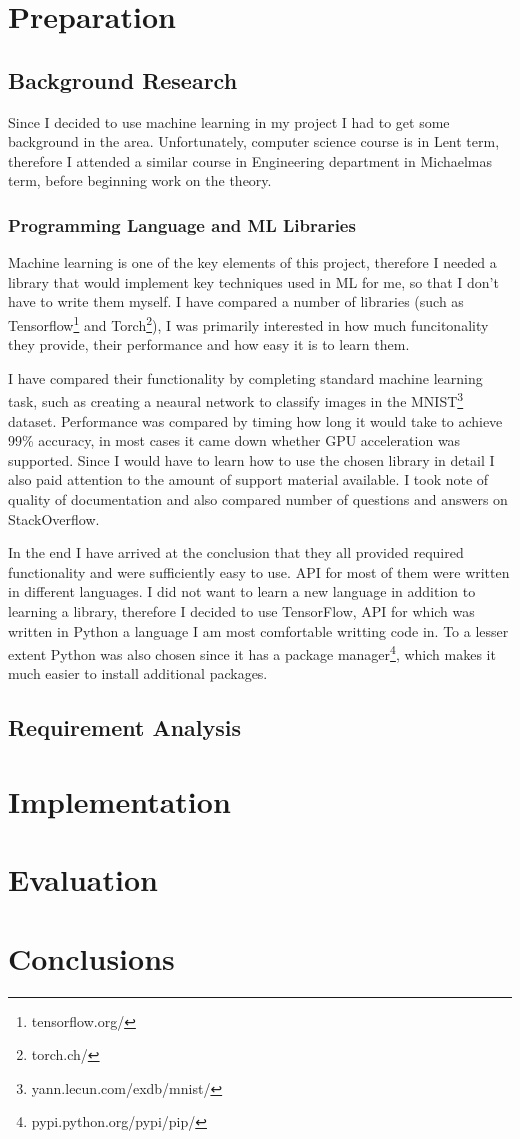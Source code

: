 \documentclass[12pt,a4paper]{report}
\begin{document}
\chapter{Preparation}
\section{Background Research}
Since I decided to use machine learning in my project I had to get some background in the area.
Unfortunately, computer science course is in Lent term, therefore I attended a similar course in Engineering department in Michaelmas term, before beginning work on the theory.
\subsection*{Programming Language and ML Libraries}
Machine learning is one of the key elements of this project, therefore I needed a library that would implement key techniques used in ML for me, so that I don't have to write them myself.
I have compared a number of libraries (such as Tensorflow\footnote{tensorflow.org/} and Torch\footnote{torch.ch/}), I was primarily interested in how much funcitonality they provide, their performance and how easy it is to learn them.

I have compared their functionality by completing standard machine learning task, such as creating a neaural network to classify images in the MNIST\footnote{yann.lecun.com/exdb/mnist/} dataset.
Performance was compared by timing how long it would take to achieve 99\% accuracy, in most cases it came down whether GPU acceleration was supported.
Since I would have to learn how to use the chosen library in detail I also paid attention to the amount of support material available.
I took note of quality of documentation and also compared number of questions and answers on StackOverflow.

In the end I have arrived at the conclusion that they all provided required functionality and were 
sufficiently easy to use.
API for most of them were written in different languages.
I did not want to learn a new language in addition to learning a library, therefore I decided to use TensorFlow, API for which was written in Python a language I am most comfortable writting code in.
To a lesser extent Python was also chosen since it has a package manager\footnote{pypi.python.org/pypi/pip/}, which makes it much easier to install additional packages.
\section{Requirement Analysis}

\chapter{Implementation}
\chapter{Evaluation}
\chapter{Conclusions}

\printbibliography
\appendix
\end{document}
